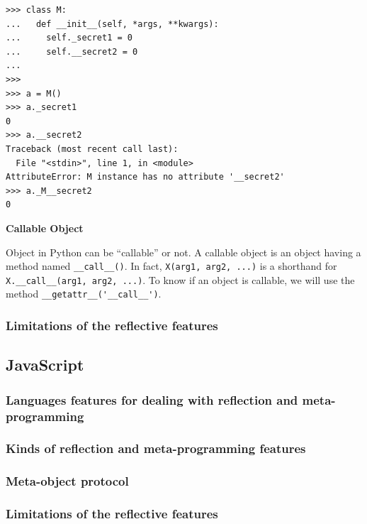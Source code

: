 \documentclass[a4paper,10pt]{article}
\begin{document}
\begin{lstlisting}
>>> class M:
...   def __init__(self, *args, **kwargs):
...     self._secret1 = 0
...     self.__secret2 = 0
...
>>>
>>> a = M()
>>> a._secret1
0
>>> a.__secret2
Traceback (most recent call last):
  File "<stdin>", line 1, in <module>
AttributeError: M instance has no attribute '__secret2'
>>> a._M__secret2 
0
\end{lstlisting}

\textbf{Callable Object}

Object in Python can be “callable” or not. A callable object is an object having a method named \lstinline|__call__()|. In fact, \lstinline|X(arg1, arg2, ...)| is a shorthand for \lstinline|X.__call__(arg1, arg2, ...)|. To know if an object is callable, we will use the method \lstinline|__getattr__('__call__')|.

\subsubsection{Limitations of the reflective features}

\subsection{JavaScript}
\setjs
\subsubsection{Languages features for dealing with reflection and meta-programming}

\subsubsection{Kinds of reflection and meta-programming features}

\subsubsection{Meta-object protocol}

\subsubsection{Limitations of the reflective features}
\end{document}
